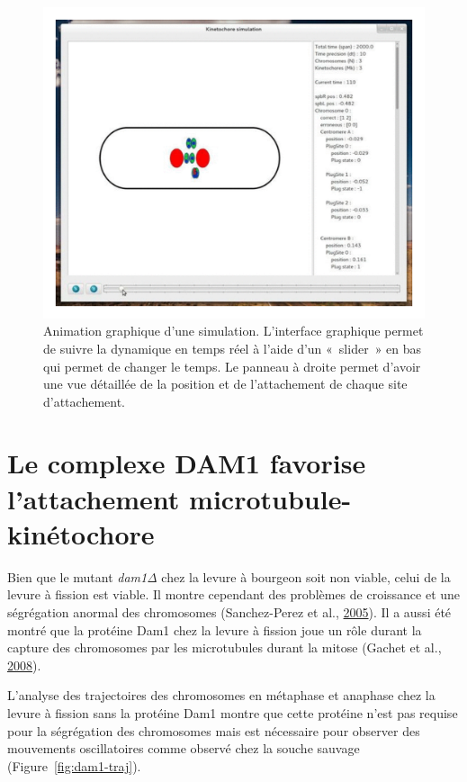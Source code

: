 \documentclass[12pt,a4paper,twoside,openright]{book}
\begin{document}
\begin{figure}[htbp]
\centering
\includegraphics{figures/annexes/gui.png}
\caption[Animation graphique d'une simulation]{\label{fig:kt-simul-gui}Animation
graphique d'une simulation. L'interface graphique permet de suivre la
dynamique en temps réel à l'aide d'un «~slider~» en bas qui permet de
changer le temps. Le panneau à droite permet d'avoir une vue détaillée
de la position et de l'attachement de chaque site d'attachement.}
\end{figure}

\cleardoublepage
\clearpage\null

\section{Le complexe DAM1 favorise l'attachement
microtubule-kinétochore}\label{le-complexe-dam1-favorise-lattachement-microtubule-kinuxe9tochore}

\label{sec:dam1}

Bien que le mutant \emph{dam1Δ} chez la levure à bourgeon soit non
viable, celui de la levure à fission est viable. Il montre cependant des
problèmes de croissance et une ségrégation anormal des chromosomes
(Sanchez-Perez et al., \protect\hyperlink{ref-Sanchez-Perez2005}{2005}).
Il a aussi été montré que la protéine Dam1 chez la levure à fission joue
un rôle durant la capture des chromosomes par les microtubules durant la
mitose (Gachet et al., \protect\hyperlink{ref-Gachet2008a}{2008}).

L'analyse des trajectoires des chromosomes en métaphase et anaphase chez
la levure à fission sans la protéine Dam1 montre que cette protéine
n'est pas requise pour la ségrégation des chromosomes mais est
nécessaire pour observer des mouvements oscillatoires comme observé chez
la souche sauvage (Figure~\ref{fig:dam1-traj}).
\end{document}
